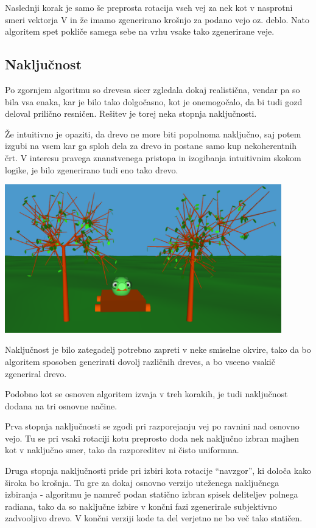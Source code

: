 \documentclass[10pt,a4paper,oneside]{book}
\begin{document}
Naslednji korak je samo še preprosta rotacija vseh vej za nek kot v
nasprotni smeri vektorja V in že imamo zgenerirano krošnjo za podano
vejo oz. deblo. Nato algoritem spet pokliče samega sebe na vrhu vsake
tako zgenerirane veje.


\subsection{Naključnost}
Po zgornjem algoritmu so drevesa sicer zgledala dokaj realistična,
vendar pa so bila vsa enaka, kar je bilo tako dolgočasno, kot je
onemogočalo, da bi tudi gozd deloval prilično resničen. Rešitev je
torej neka stopnja naključnosti.

Že intuitivno je opaziti, da drevo ne more biti popolnoma naključno,
saj potem izgubi na vsem kar ga sploh dela za drevo in postane samo
kup nekoherentnih črt. V interesu pravega znanstvenega pristopa in
izogibanja intuitivnim skokom logike, je bilo zgenerirano tudi eno
tako drevo.

\includegraphics[width=12cm]{randomtree.png}

Naključnost je bilo zategadelj potrebno zapreti v neke smiselne
okvire, tako da bo algoritem sposoben generirati dovolj različnih
dreves, a bo vseeno vsakič zgeneriral drevo.

Podobno kot se osnoven algoritem izvaja v treh korakih, je tudi
naključnost dodana na tri osnovne načine.

Prva stopnja naključnosti se zgodi pri razporejanju vej po ravnini nad
osnovno vejo. Tu se pri vsaki rotaciji kotu preprosto doda nek
naključno izbran majhen kot v naključno smer, tako da razporeditev ni
čisto uniformna.

Druga stopnja naključnosti pride pri izbiri kota rotacije ``navzgor'',
ki določa kako široka bo krošnja. Tu gre za dokaj osnovno verzijo
uteženega naključnega izbiranja - algoritmu je namreč podan statično
izbran spisek deliteljev polnega radiana, tako da so naključne izbire
v končni fazi zgenerirale subjektivno zadvooljivo drevo. V končni
verziji kode ta del verjetno ne bo več tako statičen.
\end{document}
